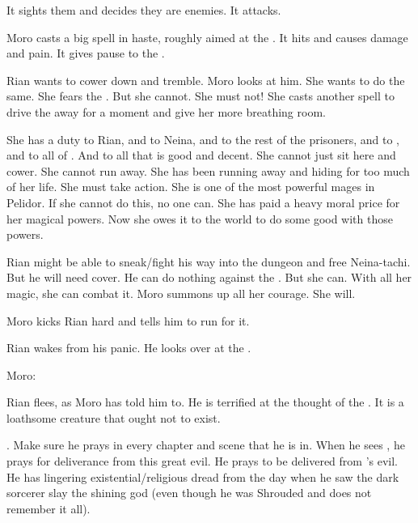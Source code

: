 It sights them and decides they are enemies.
It attacks. 

Moro casts a big spell in haste, roughly aimed at the \bane. 
It hits and causes damage and pain.
It gives pause to the \bane. 

Rian wants to cower down and tremble. 
Moro looks at him. 
She wants to do the same. 
She fears the \bane. 
But she cannot. 
She must not! 
She casts another spell to drive the \bane away for a moment and give her more breathing room. 

She has a duty to Rian, and to Neina, and to the rest of the prisoners, and to \Tiroco, and to all of \Malcur. 
And to all that is good and decent.
She cannot just sit here and cower.
She cannot run away.
She has been running away and hiding for too much of her life.
She must take action. 
She is one of the most powerful mages in Pelidor. 
If she cannot do this, no one can. 
She has paid a heavy moral price for her magical powers.
Now she owes it to the world to do some good with those powers. 

Rian might be able to sneak/fight his way into the dungeon and free Neina-tachi. 
But he will need cover. 
He can do nothing against the \bane. 
But she can. 
With all her magic, she can combat it. 
Moro summons up all her courage. 
She will. 

Moro kicks Rian hard and tells him to run for it.

Rian wakes from his panic. 
He looks over at the \bane. 

Moro:





\begin{comment}
  \section{Rian in the dungeon}
\end{comment}
\new
Rian flees, as Moro has told him to.
He is terrified at the thought of the \bane. 
It is a loathsome creature that ought not to exist. 

.
Make sure he prays in every chapter and scene that he is in.
When he sees \Ishnaruchaefir, he prays for deliverance from this great evil.
He prays to be delivered from \Isphet's evil. 
He has lingering existential/religious dread from the day when he saw the dark sorcerer slay the shining god (even though he was Shrouded and does not remember it all). 

